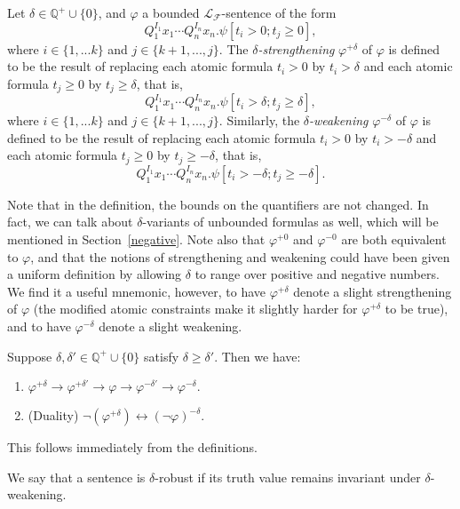 \documentclass[prodmode]{acmsmall} %
\begin{document}
\begin{definition}
Let $\delta\in \mathbb{Q}^+\cup\{0\}$, and $\varphi$ a bounded $\mathcal{L}_{\mathcal{F}}$-sentence of the form
$$Q_1^{I_1}x_1\cdots Q_n^{I_n}x_n.\psi[t_i>0; t_j\geq 0],$$
where $i\in\{1,...k\}$ and $j\in\{k+1,...,j\}$. The {\em $\delta$-strengthening} $\varphi^{+\delta}$ of $\varphi$ is defined to be the result of replacing each atomic formula $t_i > 0$ by $t_i > \delta$ and each atomic formula $t_j \geq 0$ by $t_j \geq \delta$, that is,
$$Q_1^{I_1}x_1\cdots Q_n^{I_n}x_n.\psi[t_i>\delta; t_j\geq \delta],$$
where $i\in\{1,...k\}$ and $j\in\{k+1,...,j\}$.
Similarly, the {\em $\delta$-weakening} $\varphi^{-\delta}$ of $\varphi$ is defined to be the result of replacing each atomic formula $t_i > 0$ by $t_i > -\delta$ and each atomic formula $t_j \geq 0$ by $t_j \geq -\delta$, that is,
$$Q_1^{I_1}x_1\cdots Q_n^{I_n}x_n.\psi[t_i>-\delta; t_j\geq -\delta].$$
\end{definition}

Note that in the definition, the bounds on the quantifiers are not changed. In fact, we can talk about $\delta$-variants of unbounded formulas as well, which will be mentioned in Section~\ref{negative}. Note also that $\varphi^{+0}$ and $\varphi^{-0}$ are both equivalent to $\varphi$, and that the notions of strengthening and weakening could have been given a uniform definition by allowing $\delta$ to range over positive and negative numbers. We find it a useful mnemonic, however, to have $\varphi^{+\delta}$ denote a slight strengthening of $\varphi$ (the modified atomic constraints make it slightly harder for $\varphi^{+\delta}$ to be true), and to have $\varphi^{-\delta}$ denote a slight weakening.

\begin{proposition}\label{trivial}
Suppose $\delta,\delta'\in \mathbb{Q}^+\cup\{0\}$ satisfy $\delta\geq\delta'$. Then we have: 
\begin{enumerate}
\item $\varphi^{+\delta}\rightarrow\varphi^{+\delta'} \rightarrow \varphi \rightarrow \varphi^{-\delta'}\rightarrow \varphi^{-\delta}.$
\item (Duality) $\neg(\varphi^{+\delta})\leftrightarrow (\neg\varphi)^{-\delta}$.
\end{enumerate}
\end{proposition}

This follows immediately from the definitions. 

We say that a sentence is $\delta$-robust if its truth value remains invariant under $\delta$-weakening.
\end{document}
